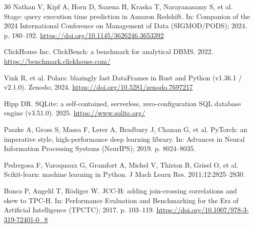 \documentclass[10pt,a4paper]{article}
\begin{document}
{\begin{thebibliography}{30}
Nathan V, Kipf A, Horn D, Saxena H, Kraska T, Narayanasamy S, et al. Stage: query execution time prediction in Amazon Redshift. In: Companion of the 2024 International Conference on Management of Data (SIGMOD/PODS); 2024. p. 180--192. \url{https://doi.org/10.1145/3626246.3653392}

ClickHouse Inc. ClickBench: a benchmark for analytical DBMS. 2022. \url{https://benchmark.clickhouse.com/}

Vink R, et al. Polars: blazingly fast DataFrames in Rust and Python (v1.36.1 / v2.1.0). Zenodo; 2024. \url{https://doi.org/10.5281/zenodo.7697217}

Hipp DR. SQLite: a self-contained, serverless, zero-configuration SQL database engine (v3.51.0). 2025. \url{https://www.sqlite.org/}

Paszke A, Gross S, Massa F, Lerer A, Bradbury J, Chanan G, et al. PyTorch: an imperative style, high-performance deep learning library. In: Advances in Neural Information Processing Systems (NeurIPS); 2019. p. 8024--8035.

Pedregosa F, Varoquaux G, Gramfort A, Michel V, Thirion B, Grisel O, et al. Scikit-learn: machine learning in Python. J Mach Learn Res. 2011;12:2825--2830.

Boncz P, Angelil T, R{\"o}diger W. JCC-H: adding join-crossing correlations and skew to TPC-H. In: Performance Evaluation and Benchmarking for the Era of Artificial Intelligence (TPCTC); 2017. p. 103--119. \url{https://doi.org/10.1007/978-3-319-72401-0_8}

\end{thebibliography}
}

\end{document}
